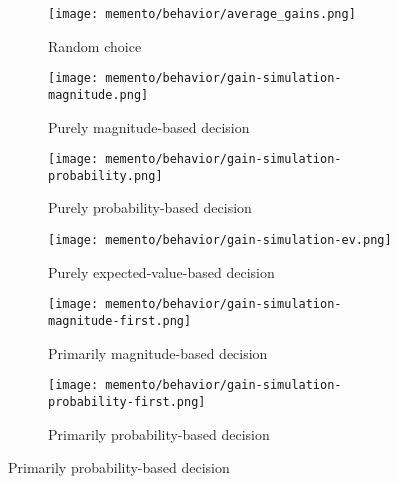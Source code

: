 

\begin{figure}
	\begin{subfigure}{0.5\textwidth}
		\texttt{[image: memento/behavior/average\_gains.png]}
		\caption{Random choice}
		\label{fig:gains}
	\end{subfigure}
	\begin{subfigure}{0.5\textwidth}
		\texttt{[image: memento/behavior/gain-simulation-magnitude.png]}
		\caption{Purely magnitude-based decision}
		\label{fig:strategy-prob}
	\end{subfigure}
	\begin{subfigure}{0.5\textwidth}
		\texttt{[image: memento/behavior/gain-simulation-probability.png]}
		\caption{Purely probability-based decision}
		\label{fig:strategy-mag}
	\end{subfigure}
	\begin{subfigure}{0.5\textwidth}
		\texttt{[image: memento/behavior/gain-simulation-ev.png]}
		\caption{Purely expected-value-based decision}
		\label{fig:strategy-ev}
	\end{subfigure}
	\begin{subfigure}{0.5\textwidth}
		\texttt{[image: memento/behavior/gain-simulation-magnitude-first.png]}
		\caption{Primarily magnitude-based decision}
		\label{fig:strategy-mag-first}
	\end{subfigure}
	\begin{subfigure}{0.5\textwidth}
		\texttt{[image: memento/behavior/gain-simulation-probability-first.png]}
		\caption{Primarily probability-based decision}
		\label{fig:strategy-prob-first}
	\end{subfigure}

\end{figure}
